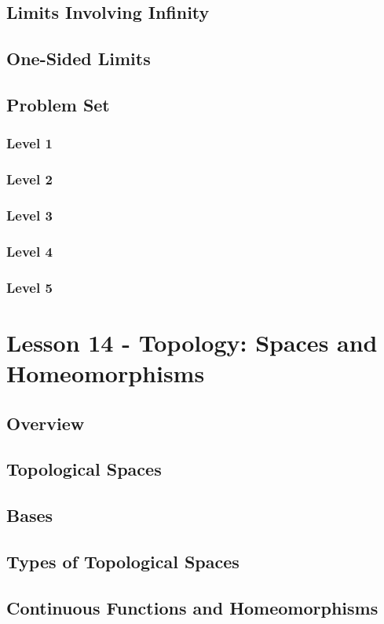 \documentclass{article}
\begin{document}
\subsection{Limits Involving Infinity}
\subsection{One-Sided Limits}
\subsection{Problem Set}
\subsubsection{Level 1}
\subsubsection{Level 2}
\subsubsection{Level 3}
\subsubsection{Level 4}
\subsubsection{Level 5}
\pagebreak

\section{Lesson 14 - Topology: Spaces and Homeomorphisms}
\subsection{Overview}
\subsection{Topological Spaces}
\subsection{Bases}
\subsection{Types of Topological Spaces}
\subsection{Continuous Functions and Homeomorphisms}
\end{document}
